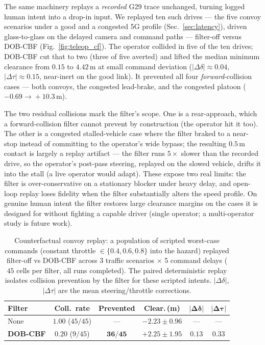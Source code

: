 \documentclass[conference,letterpaper,10pt]{IEEEtran}
\begin{document}
The same machinery replays a \emph{recorded} G29 trace unchanged, turning
logged human intent into a drop-in input. We replayed ten such drives ---
the five convoy scenarios under a good and a congested 5G profile
(Sec.~\ref{sec:latency}), driven glass-to-glass on the delayed camera and
command paths --- filter-off versus DOB-CBF (Fig.~\ref{fig:teleop_cf}).
The operator collided in five of the ten drives; DOB-CBF cut that to two
(three of five averted) and lifted the median minimum clearance from
$0.15$ to $4.42\,$m at small command deviation
($|\Delta\delta|\!\approx\!0.04$, $|\Delta\tau|\!\approx\!0.15$, near-inert
on the good link). It prevented all four \emph{forward}-collision cases
--- both convoys, the congested lead-brake, and the congested platoon
($-0.69\!\to\!+10.3\,$m).

The two residual collisions mark the filter's scope. One is a
rear-approach, which a forward-collision filter cannot prevent by
construction (the operator hit it too). The other is a congested
stalled-vehicle case where the filter braked to a near-stop instead of
committing to the operator's wide bypass; the resulting $0.5\,$m contact
is largely a replay artifact --- the filter runs $5\times$ slower than the
recorded drive, so the operator's post-pass steering, replayed on the
slowed vehicle, drifts it into the stall (a live operator would adapt).
These expose two real limits: the filter is over-conservative on a
stationary blocker under heavy delay, and open-loop replay loses fidelity
when the filter substantially alters the speed profile. On genuine human
intent the filter restores large clearance margins on the cases it is
designed for without fighting a capable driver (single operator; a
multi-operator study is future work).

\begin{table}[!t]
  \renewcommand{\arraystretch}{1.10}
  \caption{Counterfactual convoy replay: a population of scripted worst-case commands
    (constant throttle $\in\{0.4,0.6,0.8\}$ into the hazard) replayed
    filter-off vs DOB-CBF across 3 traffic scenarios $\times$ 5 command delays
    ($45$ cells per filter, all runs completed). The paired
    deterministic replay isolates collision prevention by the filter for these
    scripted intents.
    $|\Delta\delta|$, $|\Delta\tau|$ are the mean
    steering/throttle corrections.}
  \label{tab:convoy_cf}
  \centering
  \setlength{\tabcolsep}{3pt}
  \footnotesize
  \begin{tabular}{lccccc}
    \toprule
    \textbf{Filter} & \textbf{Coll.\ rate} & \textbf{Prevented} & \textbf{Clear.\,(m)} & $\mathbf{|\Delta\delta|}$ & $\mathbf{|\Delta\tau|}$\\
    \midrule
    None      & $1.00$ ($45/45$) & --- & $-2.23\!\pm\!0.96$ & --- & ---\\
    \textbf{DOB-CBF} & $\mathbf{0.20}$ ($9/45$) & $\mathbf{36/45}$ & $\mathbf{+2.25\!\pm\!1.95}$ & $0.13$ & $0.33$\\
    \bottomrule
  \end{tabular}
\end{table}
\end{document}
